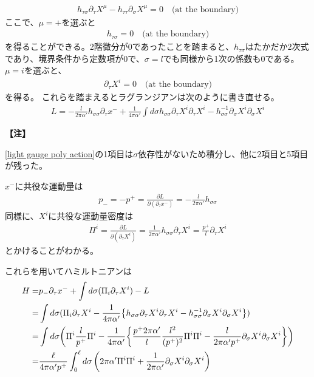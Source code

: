 \documentclass[11pt, dvipdfmx]{article}
\numberwithin{equation}{section}
\newcommand{\blankline}{\par\vspace{\baselineskip}} %
\newenvironment{note}{
    \vspace{1ex} %
    \par\footnotesize\noindent\textbf{【注】}
}{
    \par\vspace{1ex} %
}
\begin{document}
\begin{align}
    h_{\tau\sigma}\partial_\tau X^\mu-h_{\tau\tau}\partial_\sigma X^\mu = 0 \quad \text{(at the boundary)}
\end{align}
ここで、$\mu=+$を選ぶと
\begin{align}
    h_{\tau\sigma}=0\quad \text{(at the boundary)}
\end{align}
を得ることができる。2階微分が0であったことを踏まると、$h_{\tau\sigma}$はたかだか2次式であり、境界条件から定数項が0で、$\sigma=l$でも同様から1次の係数も0である。
$\mu=i$を選ぶと、
\begin{align}
    \partial_\tau X^i = 0 \quad \text{(at the boundary)}\label{light cone Neumann}
\end{align}
を得る。
これらを踏まえるとラグランジアンは次のように書き直せる。
\begin{align}
    L=-\frac{l}{2\pi \alpha'}h_{\sigma\sigma}\partial_\tau x^-+\frac{1}{4\pi\alpha'}\int d\sigma h_{\sigma\sigma} \partial_\tau X^i \partial_\tau X^i-h_{\sigma\sigma}^{-1}  \partial_\sigma X^i \partial_\sigma X^i
\end{align}
\begin{note}
    \eqref{light gauge poly action}の1項目は$\sigma$依存性がないため積分し、他に2項目と5項目が残った。
\end{note}
$x^-$に共役な運動量は
\begin{align}
    p_{-} = -p^+=\frac{\partial L}{\partial (\partial_\tau x^-)} = -\frac{l}{2\pi \alpha'} h_{\sigma\sigma}
\end{align}
同様に、$X^i$に共役な運動量密度は
\begin{align}
    \Pi^i = \frac{\partial L}{\partial (\partial_\tau X^i)} = \frac{1}{2\pi\alpha'} h_{\sigma\sigma} \partial_\tau X^i
    =\frac{p^+}{l}\partial_\tau X^i
\end{align}
とかけることがわかる。
\blankline
これらを用いてハミルトニアンは
\begin{align}
    H=&p_-\partial_\tau x^- + \int d\sigma (\Pi_i \partial_\tau X^i )- L\notag\\
=&\int d\sigma  (\Pi_i \partial_\tau X^i - \frac{1}{4\pi \alpha'}\qty{ h_{\sigma\sigma}\partial_\tau X^i \partial_\tau X^i-h_{\sigma\sigma}^{-1}  \partial_\sigma X^i \partial_\sigma X^i})\notag\\
=&\int d\sigma  \qty(\Pi^i\frac{l}{p^+}\Pi^i-\frac{1}{4\pi \alpha'} \qty{ \frac{p^+2\pi\alpha'}{l}\frac{l^2}{(p^+)^2}\Pi^i\Pi^i-\frac{l}{2\pi\alpha'p^+}  \partial_\sigma X^i \partial_\sigma X^i})\notag\\
=&\frac{\ell}{4\pi\alpha' p^+} \int_0^{\ell} d\sigma \left( 2\pi\alpha' \Pi^i \Pi^i + \frac{1}{2\pi\alpha'} \partial_\sigma X^i \partial_\sigma X^i \right)\label{light cone hamiltonian}
\end{align}
\end{document}
